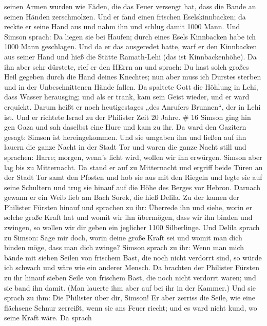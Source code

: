 seinen Armen wurden wie Fäden, die das Feuer versengt hat, dass die
Bande an seinen Händen zerschmolzen.  Und er fand einen
frischen Eselskinnbacken; da reckte er seine Hand aus und nahm ihn und
schlug damit 1000 Mann.  Und Simson sprach: Da liegen sie
bei Haufen; durch eines Esels Kinnbacken habe ich 1000 Mann geschlagen.
 Und da er das ausgeredet hatte, warf er den Kinnbacken aus
seiner Hand und hieß die Stätte Ramath-Lehi (das ist Kinnbackenhöhe).
 Da ihn aber sehr dürstete, rief er den HErrn an und
sprach: Du hast solch großes Heil gegeben durch die Hand deines
Knechtes; nun aber muss ich Durstes sterben und in der Unbeschnittenen
Hände fallen.  Da spaltete Gott die Höhlung in Lehi, dass
Wasser herausging; und als er trank, kam sein Geist wieder, und er ward
erquickt. Darum heißt er noch heutigestages „des Anrufers Brunnen``, der
in Lehi ist.  Und er richtete Israel zu der Philister Zeit
20 Jahre. \# 16  Simson ging hin gen Gaza und sah daselbst
eine Hure und kam zu ihr.  Da ward den Gazitern gesagt:
Simson ist hereingekommen. Und sie umgaben ihn und ließen auf ihn lauern
die ganze Nacht in der Stadt Tor und waren die ganze Nacht still und
sprachen: Harre; morgen, wenn's licht wird, wollen wir ihn erwürgen.
 Simson aber lag bis zu Mitternacht. Da stand er auf zu
Mitternacht und ergriff beide Türen an der Stadt Tor samt den Pfosten
und hob sie aus mit den Riegeln und legte sie auf seine Schultern und
trug sie hinauf auf die Höhe des Berges vor Hebron.  Darnach
gewann er ein Weib lieb am Bach Sorek, die hieß Delila.  Zu
der kamen der Philister Fürsten hinauf und sprachen zu ihr: Überrede ihn
und siehe, worin er solche große Kraft hat und womit wir ihn übermögen,
dass wir ihn binden und zwingen, so wollen wir dir geben ein jeglicher
1100 Silberlinge.  Und Delila sprach zu Simson: Sage mir
doch, worin deine große Kraft sei und womit man dich binden möge, dass
man dich zwinge?  Simson sprach zu ihr: Wenn man mich bände
mit sieben Seilen von frischem Bast, die noch nicht verdorrt sind, so
würde ich schwach und wäre wie ein anderer Mensch.  Da
brachten der Philister Fürsten zu ihr hinauf sieben Seile von frischem
Bast, die noch nicht verdorrt waren; und sie band ihn damit.
 (Man lauerte ihm aber auf bei ihr in der Kammer.) Und sie
sprach zu ihm: Die Philister über dir, Simson! Er aber zerriss die
Seile, wie eine flächsene Schnur zerreißt, wenn sie ans Feuer riecht;
und es ward nicht kund, wo seine Kraft wäre.  Da sprach
